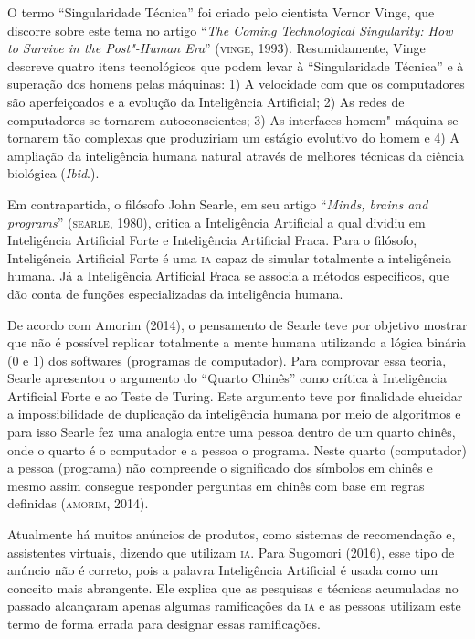 O termo ``Singularidade Técnica'' foi criado pelo cientista Vernor
Vinge, que discorre sobre este tema no artigo ``\emph{The Coming
Technological Singularity: How to Survive in the Post"-Human Era}''
(\textsc{vinge}, 1993). Resumidamente, Vinge descreve quatro itens tecnológicos
que podem levar à ``Singularidade Técnica'' e à superação dos homens
pelas máquinas: 1) A velocidade com que os computadores são
aperfeiçoados e a evolução da Inteligência Artificial; 2) As redes de
computadores se tornarem autoconscientes; 3) As interfaces homem"-máquina
se tornarem tão complexas que produziriam um estágio evolutivo do homem
e 4) A ampliação da inteligência humana natural através de melhores
técnicas da ciência biológica (\emph{Ibid}.).

Em contrapartida, o filósofo John Searle, em seu artigo ``\emph{Minds,
brains and programs}'' (\textsc{searle}, 1980), critica a Inteligência
Artificial a qual dividiu em Inteligência Artificial Forte e
Inteligência Artificial Fraca. Para o filósofo, Inteligência Artificial
Forte é uma \textsc{ia} capaz de simular totalmente a inteligência humana. Já a
Inteligência Artificial Fraca se associa a métodos específicos, que dão
conta de funções especializadas da inteligência humana.

De acordo com Amorim (2014), o pensamento de Searle teve por objetivo
mostrar que não é possível replicar totalmente a mente humana utilizando
a lógica binária (0 e 1) dos softwares (programas de computador). Para
comprovar essa teoria, Searle apresentou o argumento do ``Quarto
Chinês'' como crítica à Inteligência Artificial Forte e ao Teste de
Turing. Este argumento teve por finalidade elucidar a impossibilidade de
duplicação da inteligência humana por meio de algoritmos e para isso
Searle fez uma analogia entre uma pessoa dentro de um quarto chinês,
onde o quarto é o computador e a pessoa o programa. Neste quarto
(computador) a pessoa (programa) não compreende o significado dos
símbolos em chinês e mesmo assim consegue responder perguntas em chinês
com base em regras definidas (\textsc{amorim}, 2014).

Atualmente há muitos anúncios de produtos, como sistemas de recomendação
e, assistentes virtuais, dizendo que utilizam \textsc{ia}. Para Sugomori (2016),
esse tipo de anúncio não é correto, pois a palavra Inteligência
Artificial é usada como um conceito mais abrangente. Ele explica que as
pesquisas e técnicas acumuladas no passado alcançaram apenas algumas
ramificações da \textsc{ia} e as pessoas utilizam este termo de forma errada para
designar essas ramificações.

